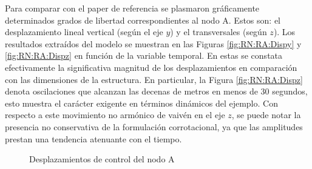 Para comparar con el paper de referencia se plasmaron gráficamente determinados grados de libertad correspondientes al nodo A. Estos son: el desplazamiento lineal vertical (según el eje $y$) y el transversales (según $z$). Los resultados extraídos del modelo se muestran en las Figuras \ref{fig:RN:RA:Dispy} y \ref{fig:RN:RA:Dispz} en función de la variable temporal. En estas se constata efectivamente la significativa magnitud de los desplazamientos en comparación con las dimensiones de la estructura. En particular, la Figura \ref{fig:RN:RA:Dispz} denota oscilaciones que alcanzan las decenas de metros en menos de 30 segundos, esto muestra el carácter exigente en términos dinámicos del ejemplo. Con respecto a este movimiento no armónico  de vaivén en el eje $z$, se puede notar la presencia no conservativa de la formulación corrotacional, ya que las amplitudes prestan una tendencia atenuante con el tiempo. 

\begingroup
\centering
\begin{figure}[htbp]
	\centering
	\label{fig:RN:RA:DispyA}
	\label{fig:RN:RA:DispzA}
	\caption{Desplazamientos de control del nodo A} \label{fig:RN:RA:DispsA}
\end{figure}
\endgroup

